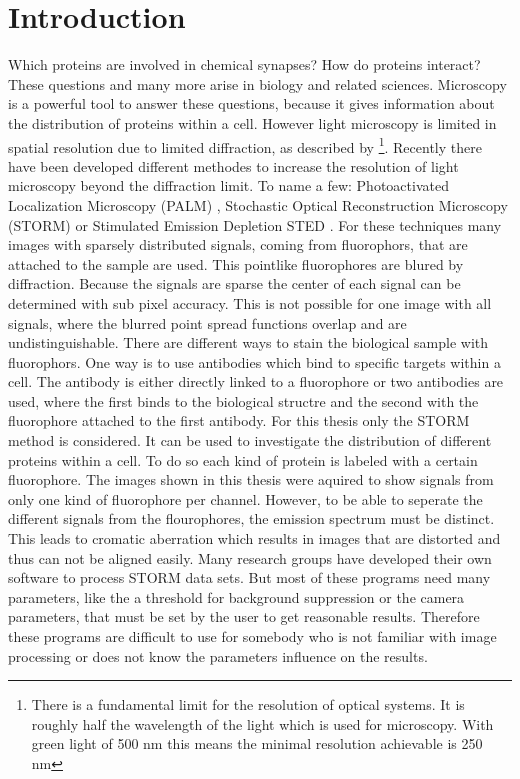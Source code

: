 \chapter{Introduction}
Which proteins are involved in chemical synapses? How do proteins interact? These questions and many more arise in biology and related sciences. Microscopy is a powerful tool to answer these questions, because it gives information about the distribution of proteins within a cell. However light microscopy is limited in spatial resolution due to limited diffraction, as described by \cite{Abbe} \footnote{There is a fundamental limit for the resolution of optical systems. It is roughly half the wavelength of the light which is used for microscopy. With green light of 500 nm this means the minimal resolution achievable is 250 nm}. Recently there have been developed different methodes to increase the resolution of light microscopy beyond the diffraction limit. To name a few: Photoactivated Localization Microscopy (PALM) \cite{Palm}, Stochastic Optical Reconstruction Microscopy (STORM) \cite{Storm} or Stimulated Emission Depletion STED \cite{sted}. For these techniques many images with sparsely distributed signals, coming from fluorophors, that are attached to the sample are used. This pointlike fluorophores are blured by diffraction. Because the signals are sparse the center of each signal can be determined with sub pixel accuracy. This is not possible for one image with all signals, where the blurred point spread functions overlap and are undistinguishable. There are different ways to stain the biological sample with fluorophors. One way is to use antibodies which bind to specific targets within a cell. The antibody is either directly linked to a fluorophore or two antibodies are used, where the first binds to the biological structre and the second with the fluorophore attached to the first antibody. 
\newline
For this thesis only the STORM method is considered. It can be used to investigate the distribution of different proteins within a cell. To do so each kind of protein is labeled with a certain fluorophore. The images shown in this thesis were aquired to show signals from only one kind of fluorophore per channel. However, to be able to seperate the different signals from the flourophores, the emission spectrum must be distinct. This leads to cromatic aberration which results in images that are distorted and thus can not be aligned easily.\newline 
Many research groups have developed their own software to process STORM data sets. But most of these programs need many parameters, like the a threshold for background suppression or the camera parameters, that must be set by the user to get reasonable results. Therefore these programs are difficult to use for somebody who is not familiar with image processing or does not know the parameters influence on the results.\newline

